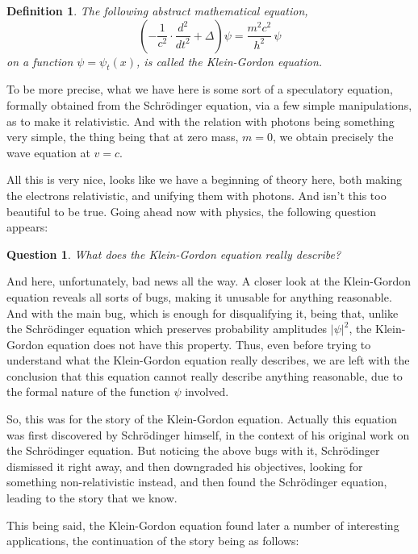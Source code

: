 \documentclass[12pt]{amsbook}
\newtheorem{definition}[theorem]{Definition}
\newtheorem{question}[theorem]{Question}
\begin{document}
\begin{definition}
The following abstract mathematical equation,
$$\left(-\frac{1}{c^2}\cdot\frac{d^2}{dt^2}+\Delta\right)\psi=\frac{m^2c^2}{h^2}\,\psi$$
on a function $\psi=\psi_t(x)$, is called the Klein-Gordon equation.
\end{definition}

To be more precise, what we have here is some sort of a speculatory equation, formally obtained from the Schr\"odinger equation, via a few simple manipulations, as to make it relativistic. And with the relation with photons being something very simple, the thing being that at zero mass, $m=0$, we obtain precisely the wave equation at $v=c$.

\bigskip

All this is very nice, looks like we have a beginning of theory here, both making the electrons relativistic, and unifying them with photons. And isn't this too beautiful to be true. Going ahead now with physics, the following question appears:

\begin{question}
What does the Klein-Gordon equation really describe?
\end{question}

And here, unfortunately, bad news all the way. A closer look at the Klein-Gordon equation reveals all sorts of bugs, making it unusable for anything reasonable. And with the main bug, which is enough for disqualifying it, being that, unlike the Schr\"odinger equation which preserves probability amplitudes $|\psi|^2$, the Klein-Gordon equation does not have this property. Thus, even before trying to understand what the Klein-Gordon equation really describes, we are left with the conclusion that this equation cannot really describe anything reasonable, due to the formal nature of the function $\psi$ involved.

\bigskip

So, this was for the story of the Klein-Gordon equation. Actually this equation was first discovered by Schr\"odinger himself, in the context of his original work on the Schr\"odinger equation. But noticing the above bugs with it, Schr\"odinger dismissed it right away, and then downgraded his objectives, looking for something non-relativistic instead, and then found the Schr\"odinger equation, leading to the story that we know.

\bigskip

This being said, the Klein-Gordon equation found later a number of interesting applications, the continuation of the story being as follows:
\end{document}
